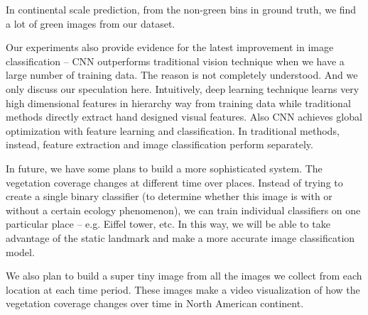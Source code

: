 
In continental scale prediction, from the non-green bins in ground truth, we find a lot of 
green images from our dataset.


Our experiments also provide evidence for the latest improvement in image classification -- CNN outperforms traditional vision technique when
 we have a large number of training data. The reason is not completely understood. And we only 
discuss our speculation here.
Intuitively, deep learning technique learns very high dimensional features in hierarchy way from training data
while traditional methods directly extract hand designed visual features. Also CNN achieves 
global optimization with feature
learning and classification. In traditional methods, instead, feature extraction and image
classification perform separately.



In future, we have some plans to build a more sophisticated system.
The vegetation coverage changes at different time over places. 
Instead of trying to create a single binary classifier (to determine whether this image is with or
without a certain ecology phenomenon),
we can train individual classifiers on one particular place 
-- e.g. Eiffel tower, etc. 
In this way, we will be able to 
take advantage of the static landmark and make a more accurate image classification model.


We also plan to build a super tiny image from all the images we collect from each location at each time period. 
These images make a video visualization of how the vegetation coverage changes over time in North American continent.

